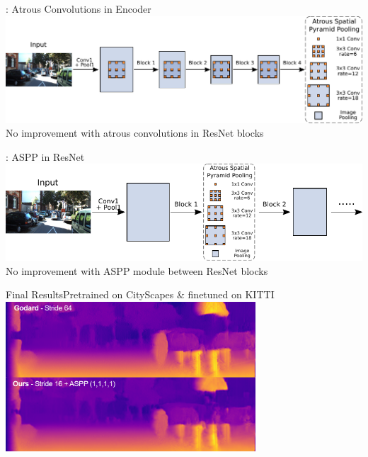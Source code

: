 \documentclass[11pt]{beamer}
\begin{document}
\begin{frame}[c]{\subsecname: Atrous Convolutions in Encoder}
  \centering
   \includegraphics[width=1.0\textwidth]{figures/architecture/encoder-with-atrous-rates.pdf}
   \vfill
   No improvement with atrous convolutions in ResNet blocks
\end{frame}

\begin{frame}[c]{\subsecname: ASPP in ResNet}
  \centering
  \includegraphics[width=1.0\textwidth]{figures/architecture/aspp-in-encoder.pdf}
  \vfill
  No improvement with ASPP module between ResNet blocks
\end{frame}

\begin{frame}[c]{Final Results}{Pretrained on CityScapes \& finetuned on KITTI}
 \centering
 \includegraphics[width=0.7\textwidth]{figures/images/final_godard_comparison.png}
 \vfill
 \scalebox{.5} {
 
 }
\end{frame}
\end{document}
